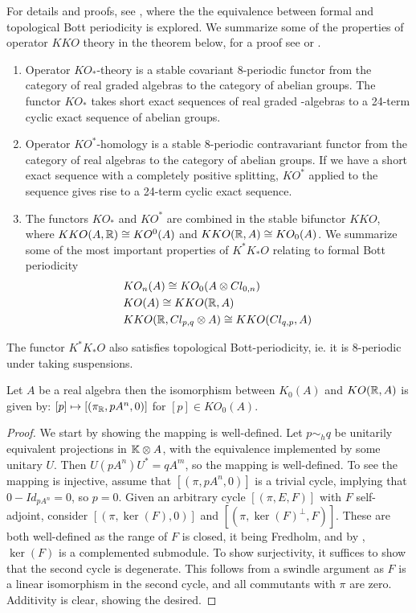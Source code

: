For details and proofs, see \cite{kasparov}, where the the equivalence between formal and topological Bott periodicity is explored.
We summarize some of the properties of operator $KKO$ theory in the theorem below, for a proof see \cite{kasparov} or \cite{schroder}.
\begin{theorem}
\begin{enumerate}
\item
	Operator $KO_{*}$-theory is a stable covariant $8$-periodic functor from the category of real graded \Cstar algebras to the category of abelian groups. The functor $KO_*$ takes short exact sequences of real graded \Cstar-algebras to a 24-term cyclic exact sequence of abelian groups. 
\item	Operator $KO^{*}$-homology is a stable $8$-periodic contravariant functor from the category of real \Cstar algebras to the category of abelian groups. If we have a short exact sequence with a completely positive splitting, $KO^{*}$ applied to the sequence gives rise to a 24-term cyclic exact sequence. 
	\item The functors $KO_*$ and $KO^*$ are combined in the stable bifunctor $KKO$, where $KKO(A,\mathbb{R})\cong KO^{0}(A)$ and $KKO(\mathbb{R},A)\cong KO_0(A)$. We summarize some of the most important properties of $K^*K_*O$ relating to formal Bott periodicity
	\begin{align*}
		&KO_n(A)\cong KO_0(A\otimes Cl_{0,n}) \\
		&KO(A)\cong KKO(\mathbb{R},A) \\
		&KKO(\mathbb{R},Cl_{p,q} \otimes A) \cong KKO(Cl_{q,p},A) 
	\end{align*}
	\end{enumerate}
	The functor $K^*K_*O$ also satisfies topological Bott-periodicity, ie. it is 8-periodic under taking suspensions. 
\end{theorem} 
\begin{lemma} \label{KTMapping}
	Let $A$ be a real \Cstar algebra then the isomorphism between $K_0(A)$ and $KO(\mathbb{R},A)$ is given by:
	$[p] \mapsto [(\pi_{\mathbb{R}},pA^n,0)]$ for $[p]\in KO_0(A)$. 
\end{lemma}
\begin{proof}
	We start by showing the mapping is well-defined. Let $p\sim_h q$ be unitarily equivalent projections in $\mathbb{K} \otimes A$, with the equivalence implemented by some unitary $U$. Then $U(pA^n)U^*=qA^m$, so the mapping is well-defined. To see the mapping is injective, assume that $[(\pi,pA^n,0)]$ is a trivial cycle, implying that $0-Id_{pA^n}=0$, so $p=0$. Given an arbitrary cycle $[(\pi,E,F)]$ with $F$ self-adjoint, consider $[(\pi,\ker(F),0)]$ and $[(\pi,\ker(F)^\perp,F)]$. These are both well-defined as the range of $F$ is closed, it being Fredholm, and by \cite[Theorem 3.2]{lance}, $\ker(F)$ is a complemented submodule. To show surjectivity, it suffices to show that the second cycle is degenerate. This follows from a swindle argument as $F$ is a linear isomorphism in the second cycle, and all commutants with $\pi$ are zero.  
	Additivity is clear, showing the desired. 
\end{proof}
